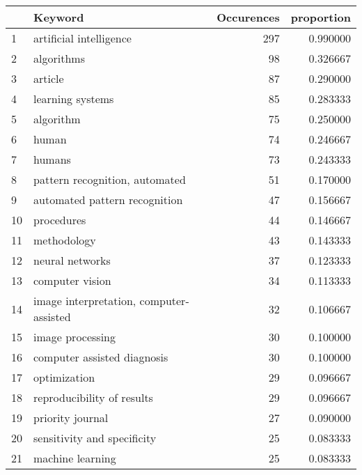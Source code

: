 \begin{tabular}{llrr}
\toprule
{} &                                  Keyword &  Occurences &  proportion \\
\midrule
1  &                  artificial intelligence &         297 &    0.990000 \\
2  &                               algorithms &          98 &    0.326667 \\
3  &                                  article &          87 &    0.290000 \\
4  &                         learning systems &          85 &    0.283333 \\
5  &                                algorithm &          75 &    0.250000 \\
6  &                                    human &          74 &    0.246667 \\
7  &                                   humans &          73 &    0.243333 \\
8  &           pattern recognition, automated &          51 &    0.170000 \\
9  &            automated pattern recognition &          47 &    0.156667 \\
10 &                               procedures &          44 &    0.146667 \\
11 &                              methodology &          43 &    0.143333 \\
12 &                          neural networks &          37 &    0.123333 \\
13 &                          computer vision &          34 &    0.113333 \\
14 &  image interpretation, computer-assisted &          32 &    0.106667 \\
15 &                         image processing &          30 &    0.100000 \\
16 &              computer assisted diagnosis &          30 &    0.100000 \\
17 &                             optimization &          29 &    0.096667 \\
18 &               reproducibility of results &          29 &    0.096667 \\
19 &                         priority journal &          27 &    0.090000 \\
20 &              sensitivity and specificity &          25 &    0.083333 \\
21 &                         machine learning &          25 &    0.083333 \\

\end{tabular}

